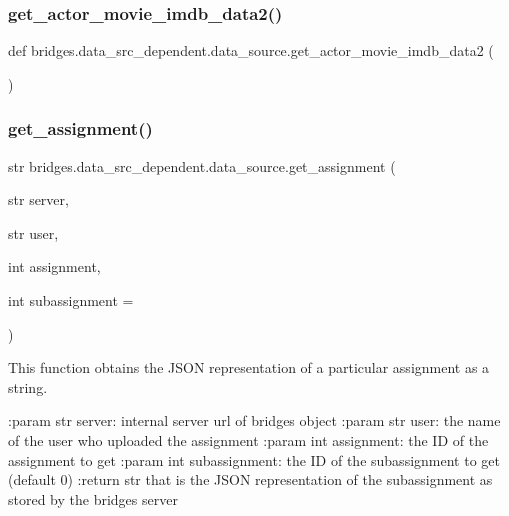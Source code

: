 \subsubsection{\texorpdfstring{get\_actor\_movie\_imdb\_data2()}{get\_actor\_movie\_imdb\_data2()}}
{\footnotesize\ttfamily def bridges.\+data\+\_\+src\+\_\+dependent.\+data\+\_\+source.\+get\+\_\+actor\+\_\+movie\+\_\+imdb\+\_\+data2 (\begin{DoxyParamCaption}{ }\end{DoxyParamCaption})}

\mbox{\label{namespacebridges_1_1data__src__dependent_1_1data__source_ada4137e0574e7f4875f83cf4afdc74d5}} 
\subsubsection{\texorpdfstring{get\_assignment()}{get\_assignment()}}
{\footnotesize\ttfamily  str bridges.\+data\+\_\+src\+\_\+dependent.\+data\+\_\+source.\+get\+\_\+assignment (\begin{DoxyParamCaption}\item[{str}]{server,  }\item[{str}]{user,  }\item[{int}]{assignment,  }\item[{int }]{subassignment = {} }\end{DoxyParamCaption})}



This function obtains the J\+S\+ON representation of a particular assignment as a string. 

\+:param str server\+: internal server url of bridges object \+:param str user\+: the name of the user who uploaded the assignment \+:param int assignment\+: the ID of the assignment to get \+:param int subassignment\+: the ID of the subassignment to get (default 0) \+:return str that is the J\+S\+ON representation of the subassignment as stored by the bridges server \mbox{\label{namespacebridges_1_1data__src__dependent_1_1data__source_ac711dee7446daedd503ce0f091a5f85e}} 
